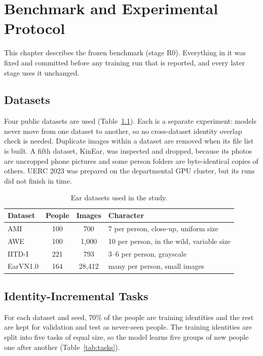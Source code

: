 \documentclass[12pt,a4paper]{report}
\begin{document}
\chapter{Benchmark and Experimental Protocol}\label{ch:benchmark}

This chapter describes the frozen benchmark (stage R0). Everything in it was fixed and committed before any training run that is reported, and every later stage uses it unchanged.

\section{Datasets}
Four public datasets are used (Table~\ref{tab:datasets}). Each is a separate experiment: models never move from one dataset to another, so no cross-dataset identity overlap check is needed. Duplicate images within a dataset are removed when its file list is built. A fifth dataset, KinEar, was inspected and dropped, because its photos are uncropped phone pictures and some person folders are byte-identical copies of others. UERC 2023 \cite{emersic2023uerc} was prepared on the departmental GPU cluster, but its runs did not finish in time.

\begin{table}[H]
\centering
\small
\caption{Ear datasets used in the study.}
\label{tab:datasets}
\begin{tabular}{|l|c|c|l|}
\hline
\textbf{Dataset} & \textbf{People} & \textbf{Images} & \textbf{Character} \\
\hline
AMI \cite{gonzalez2012ami} & 100 & 700 & 7 per person, close-up, uniform size \\
AWE \cite{emersic2017survey} & 100 & 1,000 & 10 per person, in the wild, variable size \\
IITD-I \cite{kumar2012iitd} & 221 & 793 & 3--6 per person, grayscale \\
EarVN1.0 \cite{hoang2019earvn} & 164 & 28,412 & many per person, small images \\
\hline
\end{tabular}
\end{table}

\section{Identity-Incremental Tasks}
For each dataset and seed, 70\% of the people are training identities and the rest are kept for validation and test as never-seen people. The training identities are split into five tasks of equal size, so the model learns five groups of new people one after another (Table~\ref{tab:tasks}).
\end{document}
